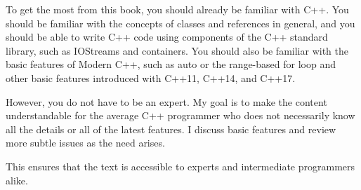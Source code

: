 To get the most from this book, you should already be familiar with C++. You should be familiar with the concepts of classes and references in general, and you should be able to write C++ code using components of the C++ standard library, such as IOStreams and containers. You should also be familiar with the basic features of Modern C++, such as auto or the range-based for loop and other basic features introduced with C++11, C++14, and C++17.

However, you do not have to be an expert. My goal is to make the content understandable for the average C++ programmer who does not necessarily know all the details or all of the latest features. I discuss basic features and review more subtle issues as the need arises.

This ensures that the text is accessible to experts and intermediate programmers alike.